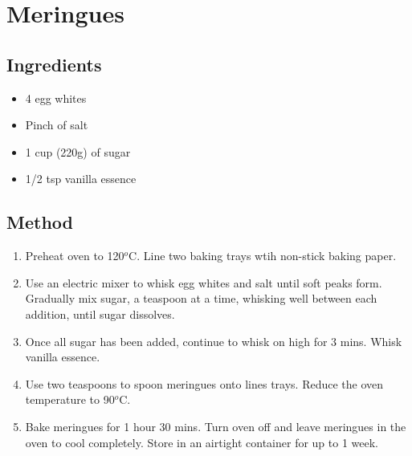 \section{Meringues}

\subsection{Ingredients}
\begin{itemize}
	\item 4 egg whites
	\item Pinch of salt
	\item 1 cup (220g) of sugar
	\item 1/2 tsp vanilla essence
\end{itemize}

\subsection{Method}
\begin{enumerate}
	\item Preheat oven to 120$^o$C. Line two baking trays wtih non-stick baking paper.
	\item Use an electric mixer to whisk egg whites and salt until soft peaks form. Gradually mix sugar, a teaspoon at a time, whisking well between each addition, until 
sugar dissolves.
	\item Once all sugar has been added, continue to whisk on high for 3 mins. Whisk vanilla essence.
	\item Use two teaspoons to spoon meringues onto lines trays. Reduce the oven temperature to 90$^o$C.
	\item Bake meringues for 1 hour 30 mins. Turn oven off and leave meringues in the oven to cool completely. Store in an airtight container for up to 1 week.
\end{enumerate}
